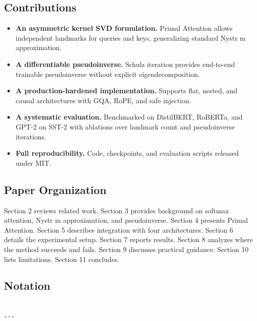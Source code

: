 \subsection{Contributions}

\begin{itemize}
\item \textbf{An asymmetric kernel SVD formulation.} Primal Attention allows independent
  landmarks for queries and keys, generalizing standard Nystr m approximation.
\item \textbf{A differentiable pseudoinverse.} Schulz iteration provides end-to-end
  trainable pseudoinverse without explicit eigendecomposition.
\item \textbf{A production-hardened implementation.} Supports flat, nested, and causal
  architectures with GQA, RoPE, and safe injection.
\item \textbf{A systematic evaluation.} Benchmarked on DistilBERT, RoBERTa, and GPT-2
  on SST-2 with ablations over landmark count and pseudoinverse iterations.
\item \textbf{Full reproducibility.} Code, checkpoints, and evaluation scripts released
  under MIT.

\end{itemize}
\subsection{Paper Organization}

Section 2 reviews related work. Section 3 provides background on softmax 
attention, Nystr m approximation, and pseudoinverse. Section 4 presents 
Primal Attention. Section 5 describes integration with four architectures. 
Section 6 details the experimental setup. Section 7 reports results. Section 
8 analyzes where the method succeeds and fails. Section 9 discusses practical 
guidance. Section 10 lists limitations. Section 11 concludes.



\subsection{Notation}

\begin{lstlisting}

---
\end{lstlisting}